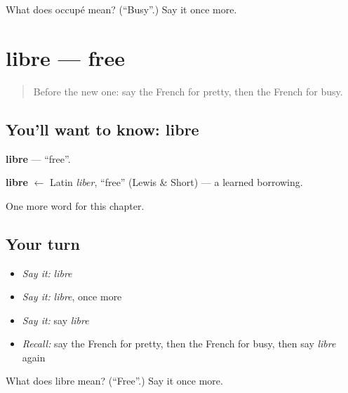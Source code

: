 \begin{tcolorbox}[breakable,colback=teal!4,colframe=teal!35!black,title={Before you move on}]
What does occupé mean? (\textquotedblleft{}Busy\textquotedblright{}.) Say it once more.
\end{tcolorbox}
\section[libre]{libre — free}

\label{lesson:FR-C131-libre}



\begin{quote}
Before the new one: say the French for pretty, then the French for busy.
\end{quote}

\subsection*{You'll want to know: libre}
\textbf{libre} — \textquotedblleft{}free\textquotedblright{}.

\begin{cousinweb}
\textbf{libre} $\leftarrow$ Latin \emph{liber}, \textquotedblleft{}free\textquotedblright{} (Lewis \& Short) — a learned borrowing.
\end{cousinweb}

\begin{grammarlens}[title={What you've built}]
One more word for this chapter.
\end{grammarlens}

\subsection*{Your turn}
\begin{itemize}
\raggedright
  \item \emph{Say it:} \emph{libre}
  \item \emph{Say it:} \emph{libre}, once more
  \item \emph{Say it:} say \emph{libre}
  \item \emph{Recall:} say the French for pretty, then the French for busy, then say \emph{libre} again
\end{itemize}

\begin{tcolorbox}[breakable,colback=teal!4,colframe=teal!35!black,title={Before you move on}]
What does libre mean? (\textquotedblleft{}Free\textquotedblright{}.) Say it once more.
\end{tcolorbox}
